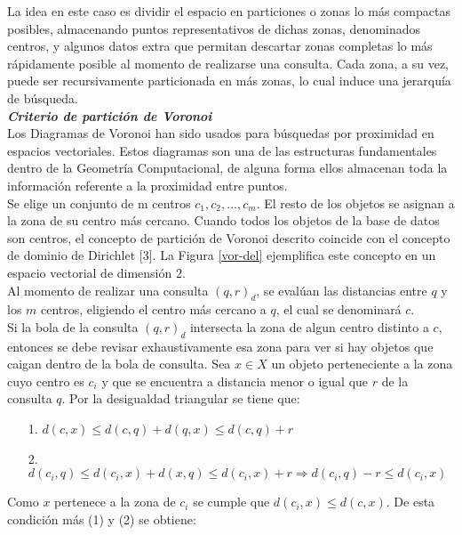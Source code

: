 La idea en este caso es dividir el espacio en particiones o zonas lo m\'as compactas posibles, almacenando puntos representativos de dichas zonas, denominados centros, y algunos datos extra que permitan descartar zonas completas lo m\'as r\'apidamente posible al momento de realizarse una consulta. Cada zona, a su vez, puede ser recursivamente particionada en m\'as zonas, lo cual induce una jerarqu\'ia de b\'usqueda.\\

\noindent \textbf{\textit{Criterio de partici\'on de Voronoi}}\\

Los Diagramas de Voronoi \cite{AUR91} han sido usados para b\'usquedas por proximidad en espacios vectoriales. Estos diagramas son una de las estructuras fundamentales dentro de la Geometr\'ia Computacional, de alguna forma ellos almacenan toda la informaci\'on referente a la proximidad entre puntos.\\

Se elige un conjunto de m centros ${c_1,c_2,...,c_m}$. El resto de los objetos se asignan a la zona de su centro m\'as cercano. Cuando todos los objetos de la base de datos son centros, el concepto de partici\'on de Voronoi descrito coincide con el concepto de dominio de Dirichlet [3]. La Figura \ref{vor-del} ejemplifica este concepto en un espacio vectorial 
de dimensi\'on 2.\\


Al momento de realizar una consulta $(q, r)_d$, se eval\'uan las distancias entre $q$ y los $m$ centros, eligiendo el centro m\'as cercano a $q$, el cual se denominar\'a $c$.\\

Si la bola de la consulta $(q, r)_d$ intersecta la zona de algun centro distinto a $c$, entonces se debe revisar exhaustivamente esa zona para ver si hay objetos que caigan dentro de la bola de consulta. Sea $x \in X$ un objeto perteneciente a la zona cuyo centro es $c_i$ y que se encuentra a distancia menor o igual que $r$ de la consulta $q$. Por la desigualdad triangular se tiene que:

\begin{enumerate}
\item [1.] $d(c,x) \leq d(c,q) + d(q,x) \leq d(c,q) + r$
\item [2.]$d(c_i,q) \leq d(c_i,x) + d(x,q) \leq d(c_i,x) + r  \Rightarrow d(c_i,q) - r \leq d(c_i,x)$
\end{enumerate}

Como $x$ pertenece a la zona de $c_i$ se cumple que  $d(c_i,x) \leq d(c,x)$. De esta condici\'on m\'as (1) y (2) se obtiene:


